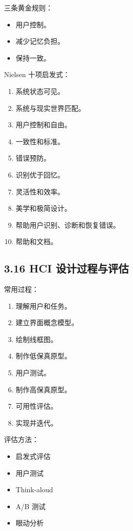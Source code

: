 \documentclass[UTF8,zihao=-4]{ctexart}
\begin{document}
三条黄金规则：

\begin{itemize}
\item 用户控制。
\item 减少记忆负担。
\item 保持一致。
\end{itemize}

Nielsen 十项启发式：

\begin{enumerate}
\item 系统状态可见。
\item 系统与现实世界匹配。
\item 用户控制和自由。
\item 一致性和标准。
\item 错误预防。
\item 识别优于回忆。
\item 灵活性和效率。
\item 美学和极简设计。
\item 帮助用户识别、诊断和恢复错误。
\item 帮助和文档。
\end{enumerate}

\subsection{3.16 HCI 设计过程与评估}

常用过程：

\begin{enumerate}
\item 理解用户和任务。
\item 建立界面概念模型。
\item 绘制线框图。
\item 制作低保真原型。
\item 用户测试。
\item 制作高保真原型。
\item 可用性评估。
\item 实现并迭代。
\end{enumerate}

评估方法：

\begin{itemize}
\item 启发式评估
\item 用户测试
\item Think-aloud
\item A/B 测试
\item 眼动分析
\end{itemize}
\end{document}
